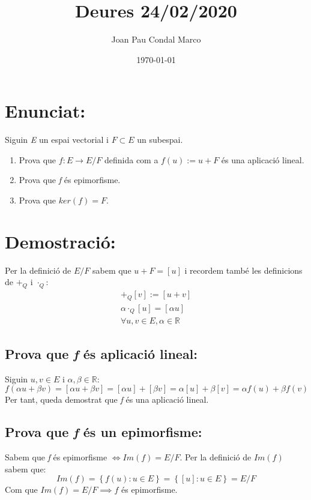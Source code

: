 \documentclass[a4paper, 11pt]{article}
\title{Deures 24/02/2020}
\author{Joan Pau Condal Marco}
\date{\today}
\begin{document}
    \maketitle
    \justify

    \section{Enunciat:}
        Siguin \emph{E} un espai vectorial i ${F\subset E}$ un subespai.
        \begin{enumerate}
            \item Prova que ${f:E \rightarrow E/F}$ definida com a ${f(u) := u + F}$ \'es una aplicaci\'o lineal.
            \item Prova que \emph{f} \'es epimorfisme.
            \item Prova que ${ker(f) = F}$.
        \end{enumerate}

    \section{Demostraci\'o:}
        Per la definici\'o de ${E/F}$ sabem que ${u+F = [u]}$ i recordem tamb\'e les definicions de ${+_Q \text{ i } \cdot_Q}$:
        \begin{gather*}
            [u] +_Q [v] := [u+v]\\
            \alpha\cdot_Q [u] = [\alpha u]\\
            \forall u,v \in E, \alpha \in \mathbb{R}
        \end{gather*}

        \subsection{Prova que \emph{f} \'es aplicaci\'o lineal:}
            Siguin ${u,v \in E}$ i ${\alpha,\beta\in\mathbb{R}}$:
            \begin{equation*}
                f(\alpha u + \beta v) = [\alpha u + \beta v] = [\alpha u] + [\beta v] = \alpha [u] + \beta [v] = \alpha f(u) + \beta f(v) 
            \end{equation*}
            Per tant, queda demostrat que \emph{f} \'es una aplicaci\'o lineal.

        \subsection{Prova que \emph{f} \'es un epimorfisme:}
            Sabem que \emph{f} \'es epimorfisme ${\iff Im(f) = E/F}$.
            Per la definici\'o de ${Im(f)}$ sabem que:
            \begin{equation*}
                Im(f) = \left\{f(u): u\in E\right\} = \left\{[u]: u\in E\right\} = E/F
            \end{equation*}
            Com que ${Im(f) = E/F \implies f}$ \'es epimorfisme.
\end{document}
